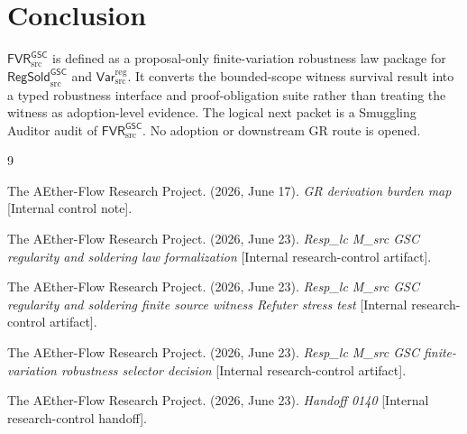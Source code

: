\documentclass[11pt]{article}
\newcommand{\RegSold}{\mathsf{RegSold}_{\mathrm{src}}^{\mathsf{GSC}}}
\newcommand{\FVR}{\mathsf{FVR}_{\mathrm{src}}^{\mathsf{GSC}}}
\newcommand{\VarRegSrc}{\mathsf{Var}^{\mathrm{reg}}_{\mathrm{src}}}
\begin{document}
\section{Conclusion}

\(\FVR\) is defined as a proposal-only finite-variation robustness law package
for \(\RegSold\) and \(\VarRegSrc\). It converts the bounded-scope witness
survival result into a typed robustness interface and proof-obligation suite
rather than treating the witness as adoption-level evidence. The logical next
packet is a Smuggling Auditor audit of \(\FVR\). No adoption or downstream GR
route is opened.

\begin{thebibliography}{9}

The AEther-Flow Research Project. (2026, June 17). \emph{GR derivation
burden map} [Internal control note].

The AEther-Flow Research Project. (2026, June 23). \emph{Resp\_lc M\_src
GSC regularity and soldering law formalization}
[Internal research-control artifact].

The AEther-Flow Research Project. (2026, June 23). \emph{Resp\_lc M\_src
GSC regularity and soldering finite source witness Refuter stress test}
[Internal research-control artifact].

The AEther-Flow Research Project. (2026, June 23). \emph{Resp\_lc M\_src
GSC finite-variation robustness selector decision}
[Internal research-control artifact].

The AEther-Flow Research Project. (2026, June 23). \emph{Handoff 0140}
[Internal research-control handoff].

\end{thebibliography}
\end{document}
